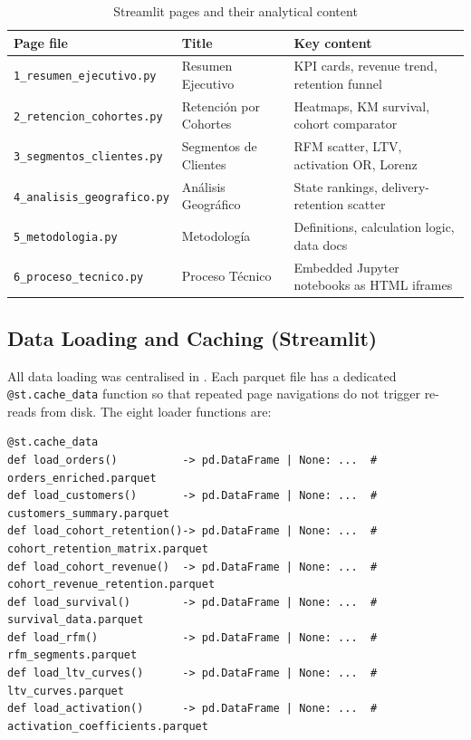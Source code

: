 \begin{table}[h]
\centering
\caption{Streamlit pages and their analytical content}
\label{tab:streamlit-pages}
\begin{tabular}{lll}
\toprule
\textbf{Page file} & \textbf{Title} & \textbf{Key content} \\
\midrule
\texttt{1\_resumen\_ejecutivo.py}   & Resumen Ejecutivo    & KPI cards, revenue trend, retention funnel \\
\texttt{2\_retencion\_cohortes.py}  & Retención por Cohortes & Heatmaps, KM survival, cohort comparator \\
\texttt{3\_segmentos\_clientes.py}  & Segmentos de Clientes & RFM scatter, LTV, activation OR, Lorenz \\
\texttt{4\_analisis\_geografico.py} & Análisis Geográfico  & State rankings, delivery-retention scatter \\
\texttt{5\_metodologia.py}          & Metodología          & Definitions, calculation logic, data docs \\
\texttt{6\_proceso\_tecnico.py}     & Proceso Técnico      & Embedded Jupyter notebooks as HTML iframes \\
\bottomrule
\end{tabular}
\end{table}

\subsection{Data Loading and Caching (Streamlit)}

All data loading was centralised in .
Each parquet file has a dedicated \texttt{@st.cache\_data} function so that
repeated page navigations do not trigger re-reads from disk. The eight loader
functions are:

\begin{lstlisting}[style=python, caption={Cached loaders in \filepath{streamlit/utils/data\_loader.py}}]
@st.cache_data
def load_orders()          -> pd.DataFrame | None: ...  # orders_enriched.parquet
def load_customers()       -> pd.DataFrame | None: ...  # customers_summary.parquet
def load_cohort_retention()-> pd.DataFrame | None: ...  # cohort_retention_matrix.parquet
def load_cohort_revenue()  -> pd.DataFrame | None: ...  # cohort_revenue_retention.parquet
def load_survival()        -> pd.DataFrame | None: ...  # survival_data.parquet
def load_rfm()             -> pd.DataFrame | None: ...  # rfm_segments.parquet
def load_ltv_curves()      -> pd.DataFrame | None: ...  # ltv_curves.parquet
def load_activation()      -> pd.DataFrame | None: ...  # activation_coefficients.parquet
\end{lstlisting}

